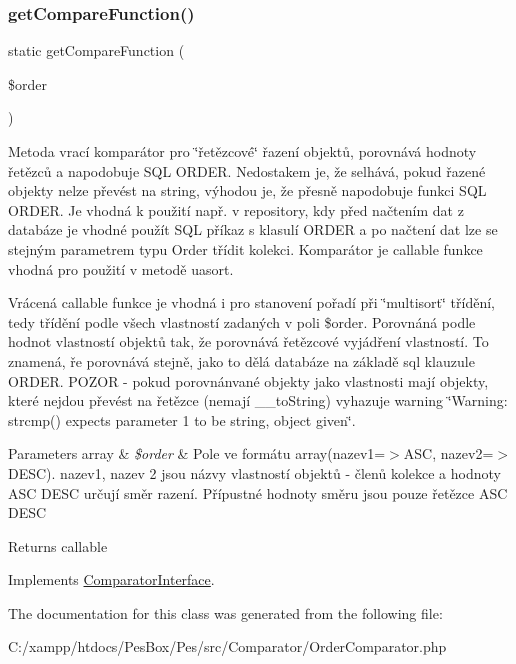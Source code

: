 \subsubsection{\texorpdfstring{get\+Compare\+Function()}{getCompareFunction()}}
{\footnotesize\ttfamily static get\+Compare\+Function (\begin{DoxyParamCaption}\item[{\mbox{\hyperlink{class_pes_1_1_query_1_1_order}{Order}}}]{\$order }\end{DoxyParamCaption})\hspace{0.3cm}{\ttfamily [static]}}

Metoda vrací komparátor pro \char`\"{}řetězcové\char`\"{} řazení objektů, porovnává hodnoty řetězců a napodobuje S\+QL O\+R\+D\+ER. Nedostakem je, že selhává, pokud řazené objekty nelze převést na string, výhodou je, že přesně napodobuje funkci S\+QL O\+R\+D\+ER. Je vhodná k použití např. v repository, kdy před načtením dat z databáze je vhodné použít S\+QL příkaz s klasulí O\+R\+D\+ER a po načtení dat lze se stejným parametrem typu Order třídit kolekci. Komparátor je callable funkce vhodná pro použití v metodě uasort.

Vrácená callable funkce je vhodná i pro stanovení pořadí při \char`\"{}multisort\char`\"{} třídění, tedy třídění podle všech vlastností zadaných v poli \$order. Porovnáná podle hodnot vlastností objektů tak, že porovnává řetězcové vyjádření vlastností. To znamená, ře porovnává stejně, jako to dělá databáze na základě sql klauzule O\+R\+D\+ER. P\+O\+Z\+OR -\/ pokud porovnánvané objekty jako vlastnosti mají objekty, které nejdou převést na řetězce (nemají \+\_\+\+\_\+to\+String) vyhazuje warning \char`\"{}\+Warning\+: strcmp() expects parameter 1 to be string, object given\char`\"{}.


\begin{DoxyParams}[1]{Parameters}
array & {\em \$order} & Pole ve formátu array(\textquotesingle{}nazev1\textquotesingle{}=$>$\textquotesingle{}A\+SC\textquotesingle{}, \textquotesingle{}nazev2=$>$\textquotesingle{}D\+E\+SC\textquotesingle{}). nazev1, nazev 2 jsou názvy vlastností objektů -\/ členů kolekce a hodnoty \textquotesingle{}A\+SC\textquotesingle{} \textquotesingle{}D\+E\+SC\textquotesingle{} určují směr razení. Přípustné hodnoty směru jsou pouze řetězce \textquotesingle{}A\+SC\textquotesingle{} \textquotesingle{}D\+E\+SC\textquotesingle{} \\
\hline
\end{DoxyParams}
\begin{DoxyReturn}{Returns}
callable 
\end{DoxyReturn}


Implements \mbox{\hyperlink{interface_pes_1_1_comparator_1_1_comparator_interface_a21aeb75d37fce6724b5a60f836dfc85c}{Comparator\+Interface}}.



The documentation for this class was generated from the following file\+:\begin{DoxyCompactItemize}
\item 
C\+:/xampp/htdocs/\+Pes\+Box/\+Pes/src/\+Comparator/Order\+Comparator.\+php\end{DoxyCompactItemize}
